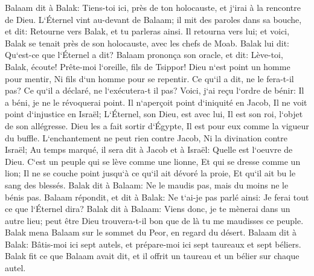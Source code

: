 \verse Balaam dit à Balak: Tiens-toi ici, près de ton holocauste, et j`irai à la rencontre de Dieu. 
\verse L`Éternel vint au-devant de Balaam; il mit des paroles dans sa bouche, et dit: Retourne vers Balak, et tu parleras ainsi. 
\verse Il retourna vers lui; et voici, Balak se tenait près de son holocauste, avec les chefs de Moab. Balak lui dit: Qu`est-ce que l`Éternel a dit? 
\verse Balaam prononça son oracle, et dit: Lève-toi, Balak, écoute! Prête-moi l`oreille, fils de Tsippor! 
\verse Dieu n`est point un homme pour mentir, Ni fils d`un homme pour se repentir. Ce qu`il a dit, ne le fera-t-il pas? Ce qu`il a déclaré, ne l`exécutera-t il pas? 
\verse Voici, j`ai reçu l`ordre de bénir: Il a béni, je ne le révoquerai point. 
\verse Il n`aperçoit point d`iniquité en Jacob, Il ne voit point d`injustice en Israël; L`Éternel, son Dieu, est avec lui, Il est son roi, l`objet de son allégresse. 
\verse Dieu les a fait sortir d`Égypte, Il est pour eux comme la vigueur du buffle. 
\verse L`enchantement ne peut rien contre Jacob, Ni la divination contre Israël; Au temps marqué, il sera dit à Jacob et à Israël: Quelle est l`oeuvre de Dieu. 
\verse C`est un peuple qui se lève comme une lionne, Et qui se dresse comme un lion; Il ne se couche point jusqu`à ce qu`il ait dévoré la proie, Et qu`il ait bu le sang des blessés. 
\verse Balak dit à Balaam: Ne le maudis pas, mais du moins ne le bénis pas. 
\verse Balaam répondit, et dit à Balak: Ne t`ai-je pas parlé ainsi: Je ferai tout ce que l`Éternel dira? 
\verse Balak dit à Balaam: Viens donc, je te mènerai dans un autre lieu; peut être Dieu trouvera-t-il bon que de là tu me maudisses ce peuple. 
\verse Balak mena Balaam sur le sommet du Peor, en regard du désert. 
\verse Balaam dit à Balak: Bâtis-moi ici sept autels, et prépare-moi ici sept taureaux et sept béliers. 
\verse Balak fit ce que Balaam avait dit, et il offrit un taureau et un bélier sur chaque autel. 

